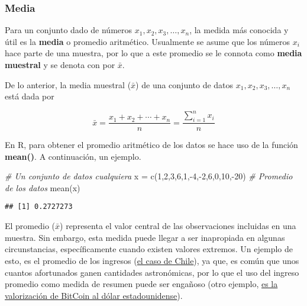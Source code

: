 \documentclass[
]{book}
\newenvironment{Shaded}{\begin{snugshade}}{\end{snugshade}}
\newcommand{\CommentTok}[1]{\textcolor[rgb]{0.56,0.35,0.01}{\textit{#1}}}
\newcommand{\DecValTok}[1]{\textcolor[rgb]{0.00,0.00,0.81}{#1}}
\newcommand{\FunctionTok}[1]{\textcolor[rgb]{0.00,0.00,0.00}{#1}}
\newcommand{\NormalTok}[1]{#1}
\newcommand{\OtherTok}[1]{\textcolor[rgb]{0.56,0.35,0.01}{#1}}
\newcommand{\SpecialCharTok}[1]{\textcolor[rgb]{0.00,0.00,0.00}{#1}}
\begin{document}
\hypertarget{media}{%
\subsubsection*{Media}\label{media}}

Para un conjunto dado de números \(x_1, x_2, x_3, \ldots, x_n\), la medida más conocida y útil es la \textbf{media} o promedio aritmético. Usualmente se asume que los números \(x_i\) hace parte de una muestra, por lo que a este promedio se le connota como \textbf{media muestral} y se denota con por \(\bar{x}\).

De lo anterior, la media muestral (\(\bar{x}\)) de una conjunto de datos \(x_1, x_2, x_3, \ldots, x_n\) está dada por \citep[página 25]{Devore}

\begin{equation}
\bar{x} = \frac{x_1 + x_2 + \cdots + x_n}{n} = \frac{\displaystyle\sum_{i=1}^{n}x_i}{n}
\label{eq:promedio}
\end{equation}

En R, para obtener el promedio aritmético de los datos se hace uso de la función \textbf{mean()}. A continuación, un ejemplo.

\begin{Shaded}
\begin{Highlighting}[]
\CommentTok{\# Un conjunto de datos cualquiera}
\NormalTok{x }\OtherTok{=} \FunctionTok{c}\NormalTok{(}\DecValTok{1}\NormalTok{,}\DecValTok{2}\NormalTok{,}\DecValTok{3}\NormalTok{,}\DecValTok{6}\NormalTok{,}\DecValTok{1}\NormalTok{,}\SpecialCharTok{{-}}\DecValTok{4}\NormalTok{,}\SpecialCharTok{{-}}\DecValTok{2}\NormalTok{,}\DecValTok{6}\NormalTok{,}\DecValTok{0}\NormalTok{,}\DecValTok{10}\NormalTok{,}\SpecialCharTok{{-}}\DecValTok{20}\NormalTok{)}
\CommentTok{\# Promedio de los datos}
\FunctionTok{mean}\NormalTok{(x)}
\end{Highlighting}
\end{Shaded}

\begin{verbatim}
## [1] 0.2727273
\end{verbatim}

El promedio (\(\bar{x}\)) representa el valor central de las observaciones incluidas en una muestra. Sin embargo, esta medida puede llegar a ser inapropiada en algunas circunstancias, específicamente cuando existen valores extremos. Un ejemplo de esto, es el promedio de los ingresos (\href{https://www.ine.gob.cl/prensa/detalle-prensa/2022/07/21/el-ingreso-laboral-promedio-mensual-en-chile-fue-de-$681.039-en-2021\#:~:text=El\%20ingreso\%20laboral\%20promedio\%20mensual\%20en\%20Chile\%20fue\%20de\%20\%24681.039\%20en\%202021,-21\%2F07\%2F2022\&text=El\%2050\%25\%20de\%20las\%20personas,ingreso\%20de\%20hasta\%20\%24457.690\%20mensuales.}{el caso de Chile}), ya que, es común que unos cuantos afortunados ganen cantidades astronómicas, por lo que el uso del ingreso promedio como medida de resumen puede ser engañoso (otro ejemplo, \href{https://www.google.com/finance/quote/BTC-USD?sa=X\&ved=2ahUKEwi3po-_m9n8AhWUL7kGHTNFCfYQ-fUHegQIFhAe\&window=MAX}{es la valorización de BitCoin al dólar estadounidense}).
\end{document}

